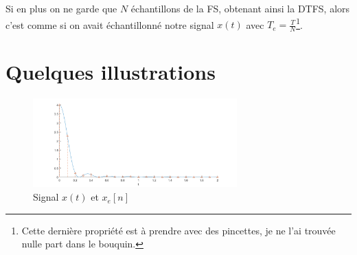 \documentclass{article}
\begin{document}
Si en plus on ne garde que $N$ échantillons de la FS, obtenant ainsi la DTFS, alors c'est comme si on avait échantillonné notre signal $x(t)$ avec $T_e = \frac{T}{N}$\footnote{Cette dernière propriété est à prendre avec des pincettes, je ne l'ai trouvée nulle part dans le bouquin.}.

\section{Quelques illustrations}

\begin{figure}
	\centering
	\includegraphics[width=0.7\textwidth]{figure.png}
	\caption{Signal $x(t)$ et $x_e[n]$}
	\label{fig:signal1}
\end{figure}
\end{document}
